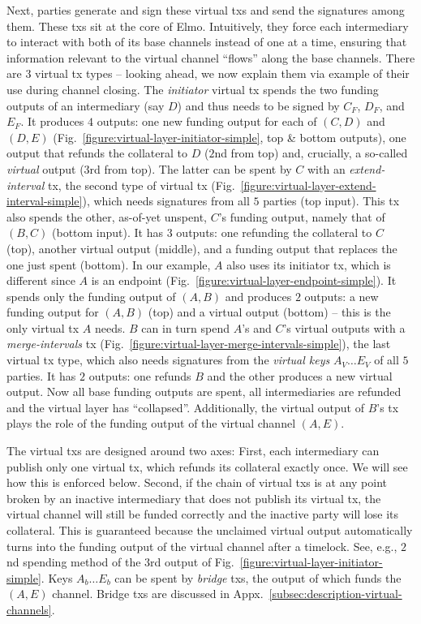   Next, parties generate and sign these virtual txs and send the signatures among
  them. These txs sit at
  the core of
  Elmo. Intuitively, they force each intermediary to interact with both of its
  base channels instead of one at a time, ensuring that information relevant to
  the virtual channel ``flows'' along the base channels. There are $3$ virtual
  tx types -- looking ahead, we now explain them via example of their use during
  channel closing. The \emph{initiator} virtual tx spends the two funding outputs of an
  intermediary (say $D$) and thus needs to be signed by $C_F$, $D_F$, and $E_F$.
  It produces $4$ outputs: one new funding
  output for each of $(C, D)$ and $(D, E)$
  (Fig.~\ref{figure:virtual-layer-initiator-simple}, top \& bottom outputs), one
  output that refunds the collateral to $D$ ($2$nd from top) and,
  crucially, a so-called \emph{virtual} output ($3$rd from top). The latter
  can be spent by $C$ with an \emph{extend-interval} tx, the second type of virtual
  tx (Fig.~\ref{figure:virtual-layer-extend-interval-simple}), which needs
  signatures from all $5$ parties (top input). This tx also
  spends the other, as-of-yet unspent, $C$'s funding output, namely that of
  $(B,C)$ (bottom
  input). It has $3$ outputs: one refunding the collateral to $C$
  (top), another virtual output (middle), and a funding output that replaces the
  one just spent (bottom). In our example, $A$ also uses its initiator tx, which
  is different since $A$ is an endpoint (Fig.~\ref{figure:virtual-layer-endpoint-simple}). It spends only the funding output of
  $(A, B)$ and produces $2$ outputs: a new funding output for $(A, B)$ (top) and
  a virtual output (bottom) -- this is the only virtual tx $A$ needs. $B$ can in
  turn spend $A$'s and $C$'s virtual outputs with a
  \emph{merge-intervals} tx
  (Fig.~\ref{figure:virtual-layer-merge-intervals-simple}), the last virtual tx
  type, which also needs signatures from the \emph{virtual keys} $A_V \dots E_V$
  of all $5$ parties. It has $2$ outputs: one refunds $B$ and
  the other produces a new virtual
  output. Now
  all base funding outputs are spent, all intermediaries are refunded and the
  virtual layer has ``collapsed''. Additionally, the
  virtual output of $B$'s tx plays the role of the funding output of the virtual
  channel $(A, E)$.

  The virtual txs are designed around two axes: First, each intermediary can
  publish only one virtual tx, which refunds its collateral
  exactly once. We will see how this is enforced below. Second, if the chain of
  virtual txs is at any point broken by
  an inactive intermediary that does not publish its virtual tx, the
  virtual channel will still be funded correctly and the inactive party will
  lose its collateral. This is guaranteed because
  the unclaimed virtual output automatically turns into the funding output of
  the virtual channel
  after a timelock. See, e.g., $2$nd spending method of the $3$rd output of
  Fig.~\ref{figure:virtual-layer-initiator-simple}. Keys $A_b \dots E_b$ can be
  spent by \emph{bridge} txs, the output of which funds the $(A, E)$ channel.
  Bridge txs are discussed in Appx.~\ref{subsec:description-virtual-channels}.

